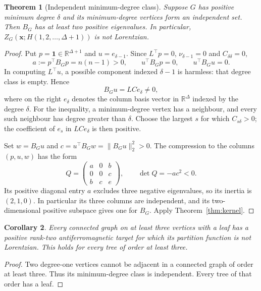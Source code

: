 \documentclass[11pt]{article}
\newtheorem{theorem}{Theorem}
\newtheorem{corollary}[theorem]{Corollary}
\theoremstyle{remark}
\newcommand{\R}{\mathbb R}
\newcommand{\one}{\mathbf 1}
\begin{document}
\begin{theorem}[Independent minimum-degree class]\label{thm:minimum}
Suppose $G$ has positive minimum degree $\delta$ and its
minimum-degree vertices form an independent set. Then $B_G$ has at
least two positive eigenvalues. In particular,
$Z_G(\mathbf x;H(1,2,\ldots,\Delta+1))$ is not Lorentzian.
\end{theorem}
\begin{proof}
Put $p=\one\in\R^{\Delta+1}$ and $u=e_{\delta-1}$.
Since $L^\top p=0$, $\nu_{\delta-1}=0$ and $C_{\delta\delta}=0$,
\begin{equation}
 a:=p^\top B_Gp=n(n-1)>0,\qquad
 u^\top B_Gp=0,\qquad u^\top B_Gu=0.                   \label{eq:null}
\end{equation}
In computing $L^\top u$, a possible component indexed $\delta-1$
is harmless: that degree class is empty. Hence
\[
 B_Gu=LCe_\delta\ne0,
\]
where on the right $e_\delta$ denotes the column basis vector in
$\R^\Delta$ indexed by the degree $\delta$.
For the inequality, a minimum-degree vertex has a neighbour, and
every such neighbour has degree greater than $\delta$. Choose the
largest $s$ for which $C_{s\delta}>0$; the coefficient of $e_s$ in
$LCe_\delta$ is then positive.

Set $w=B_Gu$ and $c=u^\top B_Gw=\|B_Gu\|_2^2>0$.
The compression to the columns $(p,u,w)$ has the form
\begin{equation}
 Q=
 \begin{pmatrix}
   a&0&b\\0&0&c\\b&c&e
 \end{pmatrix},
 \qquad \det Q=-ac^2<0.                              \label{eq:compression}
\end{equation}
Its positive diagonal entry $a$ excludes three negative eigenvalues,
so its inertia is $(2,1,0)$. In particular its three columns are
independent, and its two-dimensional positive subspace gives one for
$B_G$. Apply Theorem~\ref{thm:kernel}.
\end{proof}

\begin{corollary}\label{cor:leaf}
Every connected graph on at least three vertices with a leaf has a
positive rank-two antiferromagnetic target for which its partition
function is not Lorentzian. This holds for every tree of order at
least three.
\end{corollary}
\begin{proof}
Two degree-one vertices cannot be adjacent in a connected graph of
order at least three. Thus its minimum-degree class is independent.
Every tree of that order has a leaf.
\end{proof}
\end{document}

